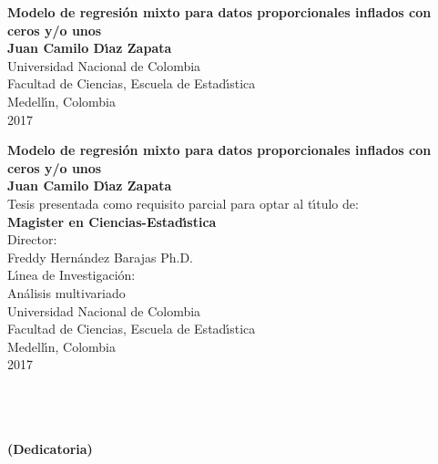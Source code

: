\begin{center}
\begin{figure}
\centering%
%
\end{figure}
\thispagestyle{empty} \vspace*{2.0cm} \textbf{\huge
Modelo de regresi\'{o}n mixto para datos proporcionales inflados con ceros y/o unos}\\[5.5cm]
\Large\textbf{Juan Camilo D\'{\i}az Zapata}\\[5.5cm]
\small Universidad Nacional de Colombia\\
Facultad de Ciencias, Escuela de Estad\'{\i}stica\\
Medell\'{\i}n, Colombia\\
2017\\
\end{center}

\newpage{\pagestyle{empty}\cleardoublepage}

\newpage
\begin{center}
\thispagestyle{empty} \vspace*{0cm} \textbf{\huge
Modelo de regresi\'{o}n mixto para datos proporcionales inflados con ceros y/o unos}\\[3.0cm]
\Large\textbf{Juan Camilo D\'{\i}az Zapata}\\[3.0cm]
\small Tesis presentada como requisito parcial para optar al
t\'{\i}tulo de:\\
\textbf{Magister en Ciencias-Estad\'{\i}stica}\\[2.5cm]
Director:\\
Freddy Hern\'{a}ndez Barajas Ph.D.\\[2.0cm]
L\'{\i}nea de Investigaci\'{o}n:\\
An\'{a}lisis multivariado\\[2.5cm]
Universidad Nacional de Colombia\\
Facultad de Ciencias, Escuela de Estad\'{\i}stica\\
Medell\'{\i}n, Colombia\\
2017\\
\end{center}

\newpage{\pagestyle{empty}\cleardoublepage}

\newpage
\thispagestyle{empty} \textbf{}\normalsize
\\\\\\%
\textbf{(Dedicatoria)}\\[4.0cm]

